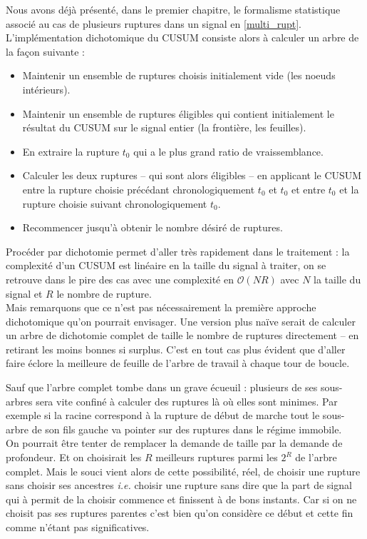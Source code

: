 \documentclass[french,11pt,notitlepage]{report}
\begin{document}
	Nous avons déjà présenté, dans le premier chapitre, le formalisme statistique associé au cas de plusieurs ruptures dans un signal en \ref{multi_rupt}.
	L'implémentation dichotomique du CUSUM consiste alors à calculer un arbre de la façon suivante :
	\\
	\begin{itemize}
	\item Maintenir un ensemble de ruptures choisis initialement vide (les noeuds intérieurs).
	\item Maintenir un ensemble de ruptures éligibles qui contient initialement le résultat du CUSUM sur le signal entier (la frontière, les feuilles).
	\item En extraire la rupture $t_0$ qui a le plus grand ratio de vraissemblance.
	\item Calculer les deux ruptures -- qui sont alors éligibles -- en applicant le CUSUM entre la rupture choisie précédant chronologiquement $t_0$ et $t_0$ et entre $t_0$ et la rupture choisie suivant chronologiquement $t_0$.
	\item Recommencer jusqu'à obtenir le nombre désiré de ruptures.\\
	\end{itemize}
	
	
	Procéder par dichotomie permet d'aller très rapidement dans le traitement : la complexité d'un CUSUM est linéaire en la taille du signal à traiter, on se retrouve dans le pire des cas avec une complexité en $\mathcal O(NR)$ avec $N$ la taille du signal et $R$ le nombre de rupture.
	\\
	
	Mais remarquons que ce n'est pas nécessairement la première approche dichotomique qu'on pourrait envisager.
	Une version plus naïve serait de calculer un arbre de dichotomie complet de taille le nombre de ruptures directement -- en retirant les moins bonnes si surplus.
	C'est en tout cas plus évident que d'aller faire éclore la meilleure de feuille de l'arbre de travail à chaque tour de boucle.
	
	Sauf que l'arbre complet tombe dans un grave écueuil : plusieurs de ses sous-arbres sera vite confiné à calculer des ruptures là où elles sont minimes.
	Par exemple si la racine correspond à la rupture de début de marche tout le sous-arbre de son fils gauche va pointer sur des ruptures dans le régime immobile.
	\\
	
	On pourrait être tenter de remplacer la demande de taille par la demande de profondeur.
	Et on choisirait les $R$ meilleurs ruptures parmi les $2^R$ de l'arbre complet.
	Mais le souci vient alors de cette possibilité, réel, de choisir une rupture sans choisir ses ancestres \emph{i.e.}
	choisir une rupture sans dire que la part de signal qui à permit de la choisir commence et finissent à de bons instants.
	Car si on ne choisit pas ses ruptures parentes c'est bien qu'on considère ce début et cette fin comme n'étant pas significatives.
	\\
	
\end{document}

